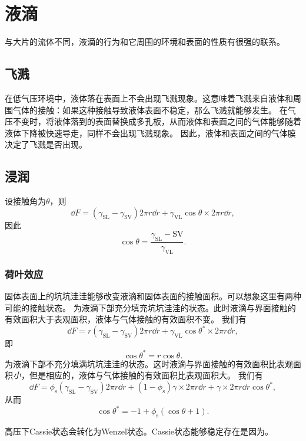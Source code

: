 \chapter{液滴}

与大片的流体不同，液滴的行为和它周围的环境和表面的性质有很强的联系。

\section{飞溅}

在低气压环境中，液体落在表面上不会出现飞溅现象。这意味着飞溅来自液体和周围气体的接触：如果这种接触导致液体表面不稳定，那么飞溅就能够发生。
在气压不变时，将液体落到的表面替换成多孔板，从而液体和表面之间的气体能够随着液体下降被快速导走，同样不会出现飞溅现象。
因此，液体和表面之间的气体膜决定了飞溅是否出现。

\section{浸润}

设接触角为$\theta$，则
\[
    \dd{F} = (\gamma_\text{SL} - \gamma_\text{SV}) 2 \pi r \dd{r} + \gamma_\text{VL} \cos \theta \times 2 \pi r \dd{r},
\]
因此
\begin{equation}
    \cos \theta = \frac{\gamma_\text{SL} - \text{SV}}{\gamma_\text{VL}}.
\end{equation}

\subsection{荷叶效应}

固体表面上的坑坑洼洼能够改变液滴和固体表面的接触面积。可以想象这里有两种可能的接触状态。
为液滴下部充分填充坑坑洼洼的状态。此时液滴与界面接触的有效面积大于表观面积，液体与气体接触的有效面积不变。
我们有
\[
    \dd{F} = r (\gamma_\text{SL} - \gamma_\text{SV}) 2 \pi r \dd{r} + \gamma_\text{VL} \cos \theta^* \times 2 \pi r \dd{r},
\]
即
\begin{equation}
    \cos \theta^* = r \cos \theta.
\end{equation}
为液滴下部不充分填满坑坑洼洼的状态。这时液滴与界面接触的有效面积比表观面积\emph{小}，但是相应的，液体与气体接触的有效面积比表观面积大。
我们有
\[
    \dd{F} = \phi_\text{s} (\gamma_\text{SL} - \gamma_\text{SV}) 2 \pi r \dd{r} + (1 - \phi_\text{s}) \gamma \times 2 \pi r \dd{r} + \gamma \times 2 \pi r \dd{r} \cos \theta^*,
\]
从而
\begin{equation}
    \cos\theta^* = - 1 + \phi_\text{s} (\cos \theta + 1).
\end{equation}

高压下Cassie状态会转化为Wenzel状态。Cassie状态能够稳定存在是因为。